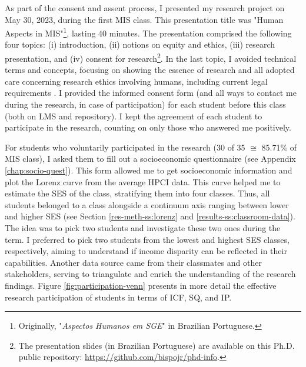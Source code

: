 As part of the consent and assent process, I presented my research project on May 30, 2023, during the first \gls{MIS} class. This presentation title was "Human Aspects in MIS"\footnote{Originally, "\textit{Aspectos Humanos em SGE}" in Brazilian Portuguese.}, lasting 40 minutes. The presentation comprised the following four topics: (i) introduction, (ii) notions on equity and ethics, (iii) research presentation, and (iv) consent for research\footnote{The presentation slides (in Brazilian Portuguese) are available on this \gls{Ph.D.} public repository: \url{https://github.com/bispojr/phd-info}.}. In the last topic, I avoided technical terms and concepts, focusing on showing the essence of research and all adopted care concerning research ethics involving humans, including current legal requirements \cite{bispojr:2021-wei}. I provided the informed consent form (and all ways to contact me during the research, in case of participation) for each student before this class (both on \gls{LMS} and repository). I kept the agreement of each student to participate in the research, counting on only those who answered me positively.

For students who voluntarily participated in the research (30 of 35 $\cong$ 85.71\% of \gls{MIS} class), I asked them to fill out a socioeconomic questionnaire (see Appendix \ref{chap:socio-quest}). This form allowed me to get socioeconomic information and plot the Lorenz curve from the average \acrfull{HPCI} data. This curve helped me to estimate the \gls{SES} of the class, stratifying them into four classes. Thus, all students belonged to a class alongside a continuum axis ranging between lower and higher \gls{SES} (see Section \ref{res-meth-ss:lorenz} and \ref{results-ss:classroom-data}). The idea was to pick two students and investigate these two ones during the term. I preferred to pick two students from the lowest and highest SES classes, respectively, aiming to understand if income disparity can be reflected in their capabilities. Another data source came from their classmates and other stakeholders, serving to triangulate and enrich the understanding of the research findings. Figure \ref{fig:participation-venn} presents in more detail the effective research participation of students in terms of \gls{ICF}, \gls{SQ}, and \gls{IP}.

